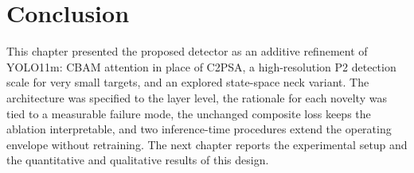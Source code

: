 \section{Conclusion}
This chapter presented the proposed detector as an additive refinement of
YOLO11m: CBAM attention in place of C2PSA, a high-resolution P2 detection scale
for very small targets, and an explored state-space neck variant. The
architecture was specified to the layer level, the rationale for each novelty
was tied to a measurable failure mode, the unchanged composite loss keeps the
ablation interpretable, and two inference-time procedures extend the operating
envelope without retraining. The next chapter reports the experimental setup and
the quantitative and qualitative results of this design.
